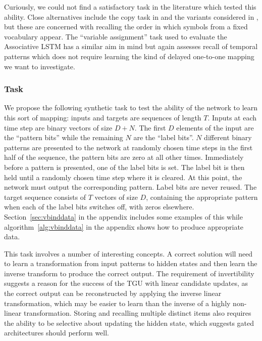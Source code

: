 Curiously, we could not find a satisfactory task in the literature which tested this ability.
Close alternatives include
the copy task in \autocite{Hochreiter1997} and the variants considered in \autocite{Graves2014}, but these
are concerned with recalling the order in which symbols from a fixed vocabulary appear. 
The ``variable assignment'' task
used to evaluate the Associative LSTM \autocite{Danihelka2016} has a similar aim in mind but again
assesses recall of temporal patterns which does not require learning the kind of delayed one-to-one
mapping we want to investigate.

\subsubsection{Task}
We propose the following synthetic task to test the ability of the network to learn this sort of
mapping: inputs and targets are sequences of length \(T\). Inputs at each time step are
binary vectors of size \(D+N\). The first \(D\) elements of the input are the ``pattern bits'' while
the remaining \(N\) are the ``label bits''. \(N\) different binary patterns are presented to the
network at randomly chosen time steps in the first half of the sequence, the pattern bits are zero at
all other times. Immediately before a pattern is presented, one of the label bits is set. The label
bit is then held until a randomly chosen time step where it is cleared.
At this point, the network must output the corresponding pattern. Label bits are never reused. The target
sequence consists of  \(T\) vectors of size \(D\), containing the appropriate pattern when each
of the label bits switches off, with zeros elsewhere. Section~\ref{sec:vbinddata} in the appendix includes
some examples of this
while algorithm~\ref{alg:vbinddata} in the appendix shows how to produce appropriate data.

This task involves a number of interesting concepts. A correct solution will need to learn a
transformation from input patterns to hidden states and then learn the inverse transform
to produce the correct output. The requirement of invertibility suggests a reason
for the success of the TGU with linear candidate updates, as the correct output can be reconstructed
by applying the inverse linear transformation, which may be easier to learn than the inverse of a
highly non-linear transformation. Storing and recalling multiple distinct items also 
requires the ability to be selective about updating the hidden state, which suggests gated architectures
should perform well.

